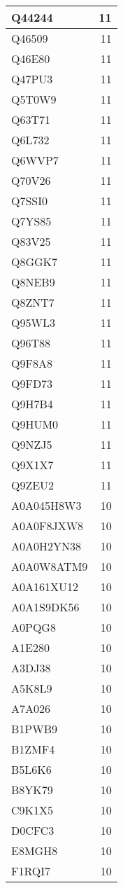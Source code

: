 \documentclass[
]{book}
\theoremstyle{definition}
\theoremstyle{definition}
\theoremstyle{definition}
\theoremstyle{definition}
\theoremstyle{remark}
\begin{document}
\begin{table}
\begin{tabular}{l|r}
\hline
Q44244 & 11\\
\hline
Q46509 & 11\\
\hline
Q46E80 & 11\\
\hline
Q47PU3 & 11\\
\hline
Q5T0W9 & 11\\
\hline
Q63T71 & 11\\
\hline
Q6L732 & 11\\
\hline
Q6WVP7 & 11\\
\hline
Q70V26 & 11\\
\hline
Q7SSI0 & 11\\
\hline
Q7YS85 & 11\\
\hline
Q83V25 & 11\\
\hline
Q8GGK7 & 11\\
\hline
Q8NEB9 & 11\\
\hline
Q8ZNT7 & 11\\
\hline
Q95WL3 & 11\\
\hline
Q96T88 & 11\\
\hline
Q9F8A8 & 11\\
\hline
Q9FD73 & 11\\
\hline
Q9H7B4 & 11\\
\hline
Q9HUM0 & 11\\
\hline
Q9NZJ5 & 11\\
\hline
Q9X1X7 & 11\\
\hline
Q9ZEU2 & 11\\
\hline
A0A045H8W3 & 10\\
\hline
A0A0F8JXW8 & 10\\
\hline
A0A0H2YN38 & 10\\
\hline
A0A0W8ATM9 & 10\\
\hline
A0A161XU12 & 10\\
\hline
A0A1S9DK56 & 10\\
\hline
A0PQG8 & 10\\
\hline
A1E280 & 10\\
\hline
A3DJ38 & 10\\
\hline
A5K8L9 & 10\\
\hline
A7A026 & 10\\
\hline
B1PWB9 & 10\\
\hline
B1ZMF4 & 10\\
\hline
B5L6K6 & 10\\
\hline
B8YK79 & 10\\
\hline
C9K1X5 & 10\\
\hline
D0CFC3 & 10\\
\hline
E8MGH8 & 10\\
\hline
F1RQI7 & 10\\

\end{tabular}
\end{table}
\end{document}
